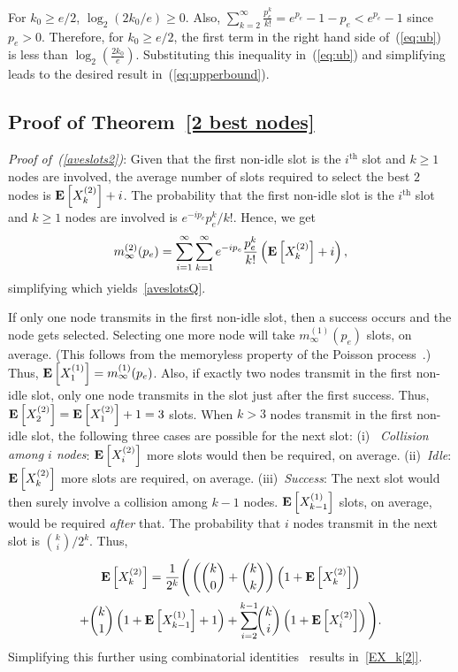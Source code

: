 \documentclass[12pt,draftcls,peerreview, onecolumn]{IEEEtran}
\newcommand{\eqn}[1]{(\ref{#1})}
\newcommand{\brac}[1]{\left({#1}\right)}
\newcommand{\kth}{^{{\mathrm{th}}}}
\newcommand{\expect}[1]{{\bf E}\left[{#1}\right]}
\newcommand{\EXQ}[2]{\expect{X_{#1}^{(#2)}}}
\newcommand{\aveslotsQ}[2]{m_{#1}^{(#2)}}
\begin{document}
For $k_0 \geq e/2$, $\log_{2}(2 k_{0}/e) \geq 0$. Also,
$\sum_{k=2}^{\infty} \frac{p_{e}^{k}}{k!} = e^{p_e}-1-p_e < e^{p_e}-1$
since $p_{e} > 0$. Therefore, for $k_0 \geq e/2$, the first term in
the right hand side of~\eqn{eq:ub} is less than $\log_{2}\brac{\frac{2
    k_{0}}{e}}$. Substituting this inequality in~\eqn{eq:ub} and
simplifying leads to the desired result in~\eqn{eq:upperbound}.




\subsection{Proof of Theorem~\ref{2 best nodes}}
\label{proof of 2 best nodes}

{\it Proof of~\eqn{aveslots2}}: Given that the first non-idle slot is
the $i\kth$ slot and $k\ge1$ nodes are involved, the average number of
slots required to select the best $2$ nodes is $\EXQ{k}{2}+i$.  The
probability that the first non-idle slot is the $i\kth$ slot and
$k\ge1$ nodes are involved is $e^{-ip_e} p_e^k/k!$.  Hence, we get
\begin{equation}
\aveslotsQ{\infty}{2}(p_e) = \sum_{i=1}^\infty\sum_{k=1}^\infty e^{-ip_e}\frac{p_e^k}{k!} \left(\EXQ{k}{2}+i\right),
\end{equation}
simplifying which yields~\eqref{aveslotsQ}.

If only one node transmits in the first non-idle slot, then a success
occurs and the node gets selected. Selecting one more node will take
$\aveslotsQ{\infty}{1}(p_e)$ slots, on average. (This follows from the
memoryless property of the Poisson process~\cite{wolff}.) Thus,
$\EXQ{1}{1}=\aveslotsQ{\infty}{1}(p_e)$.  Also, if exactly two nodes
transmit in the first non-idle slot, only one node transmits in the
slot just after the first success. Thus, $\EXQ{2}{2}=\EXQ{1}{2}+1=3$
slots.  When $k>3$ nodes transmit in the first non-idle slot, the
following three cases are possible for the next slot: (i)~{\it
  Collision among $i$ nodes}: $\EXQ{i}{2}$ more slots would then be
required, on average.  (ii)~{\it Idle}: $\EXQ{k}{2}$ more slots are
required, on average. (iii)~{\it Success}: The next slot would then
surely involve a collision among $k-1$ nodes.  $\EXQ{k-1}{1}$ slots,
on average, would be required {\it after} that.  The probability that
$i$ nodes transmit in the next slot is $\binom{k}{i}/2^{k}$. Thus,
\begin{multline} \label{collision 2 users}
\EXQ{k}{2}=\frac{1}{2^{k}}\Bigg(\left(\binom{k}{0}+\binom{k}{k}\right)\left(1+\EXQ{k}{2}\right) \\
+ \binom{k}{1}\left(1+\EXQ{k-1}{1}+1\right) +  \sum_{i=2}^{k-1}\!\! \binom{k}{i}\left(1+\EXQ{i}{2}\right)\Bigg).
\end{multline}
Simplifying this further using combinatorial
identities~\cite{gradshteyn00_book} results in~\eqref{EX_k[2]}.
\end{document}
